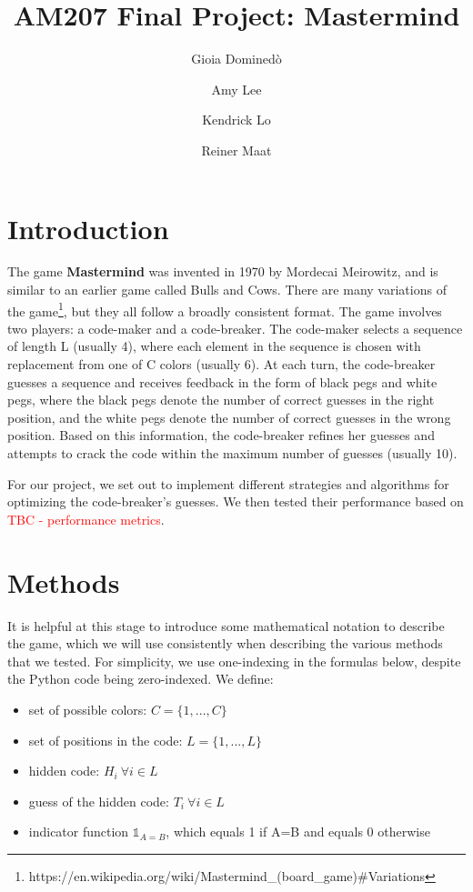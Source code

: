 \documentclass[11pt]{article}
\title{AM207 Final Project: Mastermind}
\author{Gioia Domined\`o \and Amy Lee \and Kendrick Lo \and Reiner Maat}
\begin{document}
\maketitle{}

\begin{abstract}
\end{abstract}

\section{Introduction}

The game \textbf{Mastermind} was invented in 1970 by Mordecai Meirowitz, and is similar to an earlier game called Bulls and Cows. There are many variations of the game\footnote{https://en.wikipedia.org/wiki/Mastermind\_(board\_game)\#Variations}, but they all follow a broadly consistent format. The game involves two players: a code-maker and a code-breaker. The code-maker selects a sequence of length L (usually 4), where each element in the sequence is chosen with replacement from one of C colors (usually 6). At each turn, the code-breaker guesses a sequence and receives feedback in the form of black pegs and white pegs, where the black pegs denote the number of correct guesses in the right position, and the white pegs denote the number of correct guesses in the wrong position. Based on this information, the code-breaker refines her guesses and attempts to crack the code within the maximum number of guesses (usually 10).

For our project, we set out to implement different strategies and algorithms for optimizing the code-breaker's guesses. We then tested their performance based on \textcolor{red}{TBC - performance metrics}.

\section{Methods}

It is helpful at this stage to introduce some mathematical notation to describe the game, which we will use consistently when describing the various methods that we tested. For simplicity, we use one-indexing in the formulas below, despite the Python code being zero-indexed.  We define:
\begin{itemize}
\item set of possible colors: $C = \{1, ..., C\}$
\item set of positions in the code: $L = \{1, ..., L\}$
\item hidden code: $H_i \ \forall i \in L$
\item guess of the hidden code: $T_i \ \forall i \in L$
\item indicator function $\mathbb{1}_{A=B}$, which equals 1 if A=B and equals 0 otherwise
\end{itemize}
\end{document}
